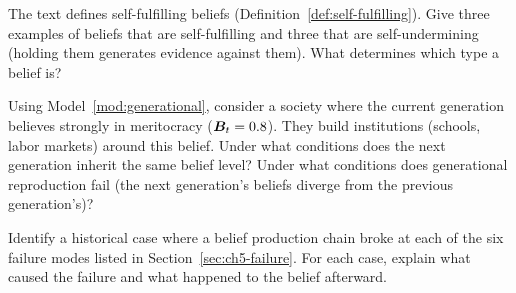 \begin{exercise}
\label{ex:ch5-self-fulfilling}
The text defines self-fulfilling beliefs (Definition~\ref{def:self-fulfilling}).
Give three examples of beliefs that are self-fulfilling and three that are self-undermining (holding them generates evidence against them).
What determines which type a belief is?
\end{exercise}

\begin{exercise}
\label{ex:ch5-generational}
Using Model~\ref{mod:generational}, consider a society where the current generation believes strongly in meritocracy ($\bm{B}_t = 0.8$).
They build institutions (schools, labor markets) around this belief.
Under what conditions does the next generation inherit the same belief level?
Under what conditions does generational reproduction fail (the next generation's beliefs diverge from the previous generation's)?
\end{exercise}

\begin{exercise}
Identify a historical case where a belief production chain broke at each of the six failure modes listed in Section~\ref{sec:ch5-failure}.
For each case, explain what caused the failure and what happened to the belief afterward.
\end{exercise}
